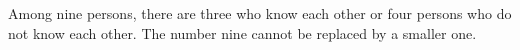 Among nine persons, there are three who know each other or four persons who do not know each other. The number nine cannot be replaced by a smaller one.
